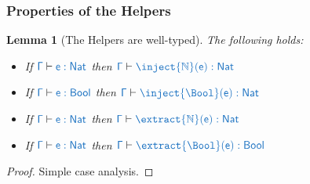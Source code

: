 \documentclass{article}
\newtheorem{lemma}[theorem]{Lemma}
\theoremstyle{definition}
\begin{document}






\subsubsection{Properties of the Helpers}
\begin{lemma}[The Helpers are well-typed]\label{thm:helpers-well-typed}
	The following holds:
	\begin{itemize}
		\item If $\src{\Gamma}\vdash\src{e:Nat}$ then $\src{\Gamma}\vdash\src{\inject{\Nat}(e):Nat}$
		\item If $\src{\Gamma}\vdash\src{e:Bool}$ then $\src{\Gamma}\vdash\src{\inject{\Bool}(e):Nat}$
		\item If $\src{\Gamma}\vdash\src{e:Nat}$ then $\src{\Gamma}\vdash\src{\extract{\Nat}(e):Nat}$
		\item If $\src{\Gamma}\vdash\src{e:Nat}$ then $\src{\Gamma}\vdash\src{\extract{\Bool}(e):Bool}$
	\end{itemize}
\end{lemma}
\begin{proof}
	Simple case analysis.
\end{proof}
\end{document}
